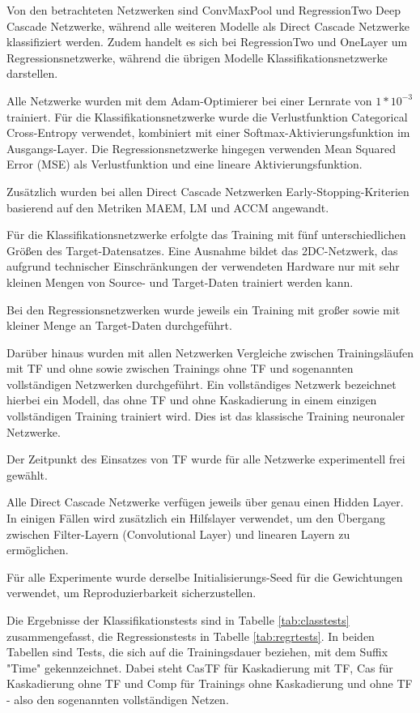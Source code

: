 Von den betrachteten Netzwerken sind ConvMaxPool und RegressionTwo Deep Cascade Netzwerke, während alle weiteren Modelle als 
Direct Cascade Netzwerke klassifiziert werden. Zudem handelt es sich bei RegressionTwo und OneLayer um Regressionsnetzwerke, während die übrigen 
Modelle Klassifikationsnetzwerke darstellen.

Alle Netzwerke wurden mit dem Adam-Optimierer bei einer Lernrate von $1*10^{-3}$ trainiert. Für die Klassifikationsnetzwerke wurde die 
Verlustfunktion Categorical Cross-Entropy verwendet, kombiniert mit einer Softmax-Aktivierungsfunktion im Ausgangs-Layer. Die 
Regressionsnetzwerke hingegen verwenden Mean Squared Error (MSE) als Verlustfunktion und eine lineare Aktivierungsfunktion.

Zusätzlich wurden bei allen Direct Cascade Netzwerken Early-Stopping-Kriterien basierend auf den Metriken MAEM, 
LM und ACCM angewandt.

Für die Klassifikationsnetzwerke erfolgte das Training mit fünf unterschiedlichen Größen des Target-Datensatzes. Eine 
Ausnahme bildet das 2DC-Netzwerk, das aufgrund technischer Einschränkungen der verwendeten Hardware nur mit sehr kleinen Mengen von Source- 
und Target-Daten trainiert werden kann.

Bei den Regressionsnetzwerken wurde jeweils ein Training mit großer sowie mit kleiner Menge an Target-Daten durchgeführt.

Darüber hinaus wurden mit allen Netzwerken Vergleiche zwischen Trainingsläufen mit TF und ohne sowie zwischen Trainings 
ohne TF und sogenannten vollständigen Netzwerken durchgeführt. Ein vollständiges Netzwerk bezeichnet hierbei ein Modell, das ohne TF 
und ohne Kaskadierung in einem einzigen vollständigen Training trainiert wird. Dies ist das klassische Training neuronaler Netzwerke. 

Der Zeitpunkt des Einsatzes von TF wurde für alle Netzwerke experimentell frei gewählt.

Alle Direct Cascade Netzwerke verfügen jeweils über genau einen Hidden Layer. In einigen Fällen wird zusätzlich ein Hilfslayer verwendet, um 
den Übergang zwischen Filter-Layern (Convolutional Layer) und linearen Layern zu ermöglichen.

Für alle Experimente wurde derselbe Initialisierungs-Seed für die Gewichtungen verwendet, um Reproduzierbarkeit sicherzustellen.

Die Ergebnisse der Klassifikationstests sind in Tabelle \ref{tab:classtests} zusammengefasst, die Regressionstests in Tabelle \ref{tab:regrtests}. 
In beiden Tabellen sind Tests, die sich auf die Trainingsdauer beziehen, mit dem Suffix "Time" gekennzeichnet. Dabei steht CasTF für Kaskadierung 
mit TF, Cas für Kaskadierung ohne TF und Comp für Trainings ohne Kaskadierung und ohne TF - 
also den sogenannten vollständigen Netzen. 

